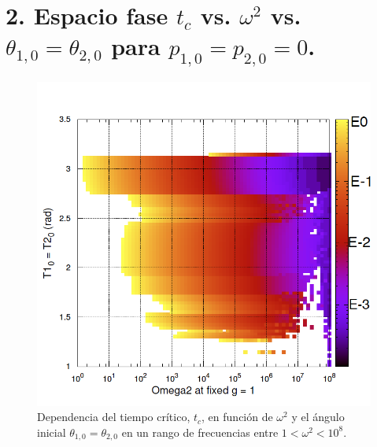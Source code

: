 \documentclass[10pt,letterpaper]{article}
\begin{document}
\section*{2. Espacio fase $t_c$ vs. $\omega^2$ vs. $\theta_{1,0} = \theta_{2,0}$ para $p_{1,0} = p_{2,0}=0$.}
\begin{figure}
\centering
\includegraphics[scale=0.45]{2DPhaseSpace_1.png}
\caption{Dependencia del tiempo crítico, $t_c$, en función de $\omega^2$ y el ángulo inicial $\theta_{1,0} = \theta_{2,0}$ en un rango de frecuencias entre $1<\omega^2<10^8$.}\label{PhaseSpace2D-1}
\end{figure}
\end{document}
